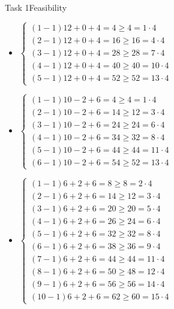 \begin{frame}[allowframebreaks]{Task 1}{Feasibility\vspace{0.5cm}}
\begin{enumerate}
\begin{itemize}
        \item $\left\{\begin{array}{l}(1-1) 12+0+4=4 \geq 4=1 \cdot 4 \\ (2-1) 12+0+4=16 \geq 16=4 \cdot 4 \\ (3-1) 12+0+4=28 \geq 28=7 \cdot 4 \\ (4-1) 12+0+4=40 \geq 40=10 \cdot 4 \\ (5-1) 12+0+4=52 \geq 52=13 \cdot 4\end{array}\right.$
        \item $\left\{\begin{array}{l}(1-1) 10-2+6=4 \geq 4=1 \cdot 4 \\ (2-1) 10-2+6=14 \geq 12=3 \cdot 4 \\ (3-1) 10-2+6=24 \geq 24=6 \cdot 4 \\ (4-1) 10-2+6=34 \geq 32=8 \cdot 4 \\ (5-1) 10-2+6=44 \geq 44=11 \cdot 4 \\ (6-1) 10-2+6=54 \geq 52=13 \cdot 4\end{array}\right.$
        \item $\left\{\begin{array}{l}(1-1) 6+2+6=8 \geq 8=2 \cdot 4 \\ (2-1) 6+2+6=14 \geq 12=3 \cdot 4 \\ (3-1) 6+2+6=20 \geq 20=5 \cdot 4 \\ (4-1) 6+2+6=26 \geq 24=6 \cdot 4 \\ (5-1) 6+2+6=32 \geq 32=8 \cdot 4 \\ (6-1) 6+2+6=38 \geq 36=9 \cdot 4 \\ (7-1) 6+2+6=44 \geq 44=11 \cdot 4 \\ (8-1) 6+2+6=50 \geq 48=12 \cdot 4 \\ (9-1) 6+2+6=56 \geq 56=14 \cdot 4 \\ (10-1) 6+2+6=62 \geq 60=15 \cdot 4\end{array}\right.$
      \end{itemize}
  \end{enumerate}
\end{frame}
